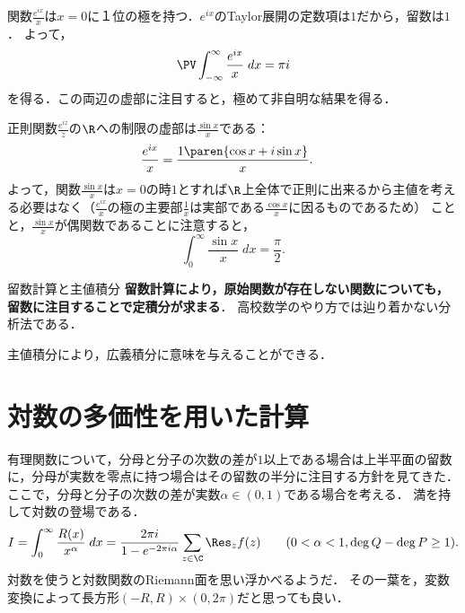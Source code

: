 \documentclass[uplatex, dvipdfmx]{jsreport}
\begin{document}
\begin{example}
    関数$\frac{e^{ix}}{x}$は$x=0$に１位の極を持つ．$e^{ix}$のTaylor展開の定数項は$1$だから，留数は$1$．
    よって，
    \[\PV\int^\infty_{-\infty}\frac{e^{ix}}{x}\;dx=\pi i\]
    を得る．この両辺の虚部に注目すると，極めて非自明な結果を得る．

    正則関数$\frac{e^{iz}}{z}$の$\R$への制限の虚部は$\frac{\sin x}{x}$である：
    \begin{align*}
        \frac{e^{ix}}{x}&=\frac{1\paren{\cos x+i\sin x}}{x}.
    \end{align*}
    よって，関数$\frac{\sin x}{x}$は$x=0$の時$1$とすれば$\R$上全体で正則に出来るから主値を考える必要はなく（$\frac{e^{ix}}{x}$の極の主要部$\frac{1}{x}$は実部である$\frac{\cos x}{x}$に因るものであるため）
    ことと，$\frac{\sin x}{x}$が偶関数であることに注意すると，
    \[\int^\infty_0\frac{\sin x}{x}\;dx=\frac{\pi}{2}.\]
\end{example}

\begin{itembox}[l]{留数計算と主値積分}
    \textbf{留数計算により，原始関数が存在しない関数についても，留数に注目することで定積分が求まる}．
    高校数学のやり方では辿り着かない分析法である．

    主値積分により，広義積分に意味を与えることができる．
\end{itembox}

\section{対数の多価性を用いた計算}

\begin{tcolorbox}[colframe=ForestGreen, colback=ForestGreen!10!white, breakable ,colbacktitle=ForestGreen!40!white, coltitle=black,fonttitle=\bfseries\sffamily,
    title=積分路上にある留数はその半分を取る]
    有理関数について，分母と分子の次数の差が$1$以上である場合は上半平面の留数に，分母が実数を零点に持つ場合はその留数の半分に注目する方針を見てきた．
    ここで，分母と分子の次数の差が実数$\alpha\in(0,1)$である場合を考える．
    満を持して対数の登場である．
    \[I=\int^\infty_0\frac{R(x)}{x^\alpha}\;dx=\frac{2\pi i}{1-e^{-2\pi i\alpha}}\sum_{z\in\C}\Res_zf(z)\qquad(0<\alpha<1,\deg Q-\deg P\ge 1).\]
    対数を使うと対数関数のRiemann面を思い浮かべるようだ．
    その一葉を，変数変換によって長方形$(-R,R)\times(0,2\pi)$だと思っても良い．
\end{tcolorbox}
\end{document}
